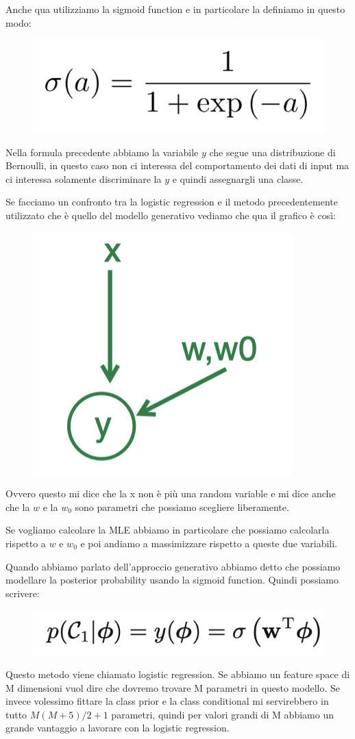 \documentclass[14pt]{extreport}
\begin{document}
Anche qua utilizziamo la sigmoid function e in particolare la definiamo in questo modo:

\begin{figure}[H]
\centering
\includegraphics[width=0.3\linewidth]{189.jpeg}
\end{figure}

Nella formula precedente abbiamo la variabile $y$ che segue una distribuzione di Bernoulli, in questo caso non ci interessa del comportamento dei dati
di input ma ci interessa solamente discriminare la $y$ e quindi assegnargli una classe.

Se facciamo un confronto tra la logistic regression e il metodo precedentemente utilizzato che è quello del modello generativo vediamo che qua il
grafico è così:

\begin{figure}[H]
\centering
\includegraphics[width=0.2\linewidth]{190.jpeg}
\end{figure}

Ovvero questo mi dice che la x non è più una random variable e mi dice anche che la $w$ e la $w_0$ sono parametri che possiamo scegliere liberamente.

Se vogliamo calcolare la MLE abbiamo in particolare che possiamo calcolarla rispetto a $w$ e $w_0$ e poi andiamo a massimizzare rispetto a queste due
variabili.


Quando abbiamo parlato dell'approccio generativo abbiamo detto che possiamo modellare la posterior probability usando la sigmoid function. Quindi
possiamo scrivere:

\begin{figure}[H]
\centering
\includegraphics[width=0.5\linewidth]{211.jpeg}
\end{figure}

Questo metodo viene chiamato logistic regression. Se abbiamo un feature space di M dimensioni vuol dire che dovremo trovare M parametri in questo
modello. Se invece volessimo fittare la class prior e la class conditional mi servirebbero in tutto $M(M+5)/2+1$ parametri, quindi per valori grandi
di M abbiamo un grande vantaggio a lavorare con la logistic regression.
\end{document}
